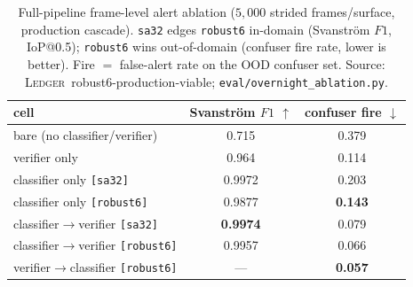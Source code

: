 \documentclass[12pt,a4paper,oneside,openright]{book}
\begin{document}
\begin{table}[htbp]
    \centering
    \caption{Full-pipeline frame-level alert ablation ($5{,}000$ strided frames/surface, production cascade). \texttt{sa32} edges \texttt{robust6} in-domain (Svanstr\"om $F1$, IoP@0.5); \texttt{robust6} wins out-of-domain (confuser fire rate, lower is better). Fire $=$ false-alert rate on the OOD confuser set. Source: \textsc{Ledger}~robust6-production-viable; \texttt{eval/overnight\_ablation.py}.}
    \label{tab:robust6_pipeline}
    \begin{tabular}{lcc}
        \toprule
        cell & Svanstr\"om $F1$ $\uparrow$ & confuser fire $\downarrow$ \\
        \midrule
        bare (no classifier/verifier)        & 0.715 & 0.379 \\
        verifier only                        & 0.964 & 0.114 \\
        classifier only \texttt{[sa32]}      & 0.9972 & 0.203 \\
        classifier only \texttt{[robust6]}   & 0.9877 & \textbf{0.143} \\
        classifier$\to$verifier \texttt{[sa32]}    & \textbf{0.9974} & 0.079 \\
        classifier$\to$verifier \texttt{[robust6]} & 0.9957 & 0.066 \\
        verifier$\to$classifier \texttt{[robust6]} & --- & \textbf{0.057} \\
        \bottomrule
    \end{tabular}
\end{table}
\end{document}
